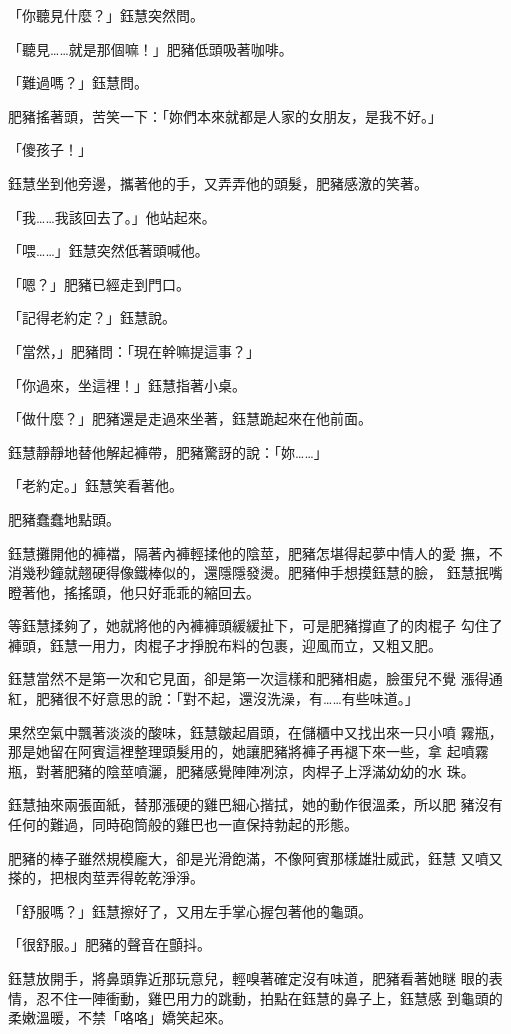 「你聽見什麼？」鈺慧突然問。

「聽見……就是那個嘛！」肥豬低頭吸著咖啡。

「難過嗎？」鈺慧問。

肥豬搖著頭，苦笑一下：「妳們本來就都是人家的女朋友，是我不好。」

「傻孩子！」

鈺慧坐到他旁邊，攜著他的手，又弄弄他的頭髮，肥豬感激的笑著。

「我……我該回去了。」他站起來。

「喂……」鈺慧突然低著頭喊他。

「嗯？」肥豬已經走到門口。

「記得老約定？」鈺慧說。

「當然，」肥豬問：「現在幹嘛提這事？」

「你過來，坐這裡！」鈺慧指著小桌。

「做什麼？」肥豬還是走過來坐著，鈺慧跪起來在他前面。

鈺慧靜靜地替他解起褲帶，肥豬驚訝的說：「妳……」

「老約定。」鈺慧笑看著他。

肥豬蠢蠢地點頭。

鈺慧攤開他的褲襠，隔著內褲輕揉他的陰莖，肥豬怎堪得起夢中情人的愛
撫，不消幾秒鐘就翹硬得像鐵棒似的，還隱隱發燙。肥豬伸手想摸鈺慧的臉，
鈺慧抿嘴瞪著他，搖搖頭，他只好乖乖的縮回去。

等鈺慧揉夠了，她就將他的內褲褲頭緩緩扯下，可是肥豬撐直了的肉棍子
勾住了褲頭，鈺慧一用力，肉棍子才掙脫布料的包裹，迎風而立，又粗又肥。

鈺慧當然不是第一次和它見面，卻是第一次這樣和肥豬相處，臉蛋兒不覺
漲得通紅，肥豬很不好意思的說：「對不起，還沒洗澡，有……有些味道。」

果然空氣中飄著淡淡的酸味，鈺慧皺起眉頭，在儲櫃中又找出來一只小噴
霧瓶，那是她留在阿賓這裡整理頭髮用的，她讓肥豬將褲子再褪下來一些，拿
起噴霧瓶，對著肥豬的陰莖噴灑，肥豬感覺陣陣冽涼，肉桿子上浮滿幼幼的水
珠。

鈺慧抽來兩張面紙，替那漲硬的雞巴細心揩拭，她的動作很溫柔，所以肥
豬沒有任何的難過，同時砲筒般的雞巴也一直保持勃起的形態。

肥豬的棒子雖然規模龐大，卻是光滑飽滿，不像阿賓那樣雄壯威武，鈺慧
又噴又搽的，把根肉莖弄得乾乾淨淨。

「舒服嗎？」鈺慧擦好了，又用左手掌心握包著他的龜頭。

「很舒服。」肥豬的聲音在顫抖。

鈺慧放開手，將鼻頭靠近那玩意兒，輕嗅著確定沒有味道，肥豬看著她瞇
眼的表情，忍不住一陣衝動，雞巴用力的跳動，拍點在鈺慧的鼻子上，鈺慧感
到龜頭的柔嫩溫暖，不禁「咯咯」嬌笑起來。

